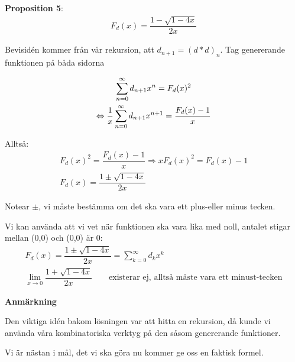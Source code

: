 \par\bigskip
\noindent\textbf{Proposition 5}:
\begin{equation*}
  \begin{gathered}
    F_d(x) = \dfrac{1-\sqrt{1-4x}}{2x}
  \end{gathered}
\end{equation*}
\par\bigskip
\noindent Bevisid\'en kommer från vår rekursion, att $d_{n+1} = (d*d)_n$. Tag genererande funktionen på båda sidorna
\par\bigskip
\begin{prf}[]{}
  \begin{equation*}
    \begin{gathered}
      \sum_{n=0}^{\infty}d_{n+1}x^n =  F_d(x)^2\\
      \Leftrightarrow\dfrac{1}{x}\sum_{n=0}^{\infty}d_{n+1}x^{n+1} =\dfrac{F_d(x)-1}{x}
    \end{gathered}
  \end{equation*}\par
  \noindent Alltså:
  \begin{equation*}
    \begin{gathered}
      F_d(x)^2 = \dfrac{F_d(x)-1}{x}\Rightarrow xF_d(x)^2 = F_d(x)-1\\
      F_d(x) = \dfrac{1\pm\sqrt{1-4x}}{2x}
    \end{gathered}
  \end{equation*}\par
  \noindent Notear $\pm$, vi måste bestämma om det ska vara ett plus-eller minus tecken.\par
  \noindent Vi kan använda att vi vet när funktionen ska vara lika med noll, antalet stigar mellan (0,0) och (0,0) är 0:
  \begin{equation*}
    \begin{gathered}
      F_d(x) = \dfrac{1\pm\sqrt{1-4x}}{2x} = \sum_{k=0}^{\infty}d_kx^k\\
      \lim_{x\to0}\dfrac{1+\sqrt{1-4x}}{2x}\qquad\text{existerar ej, alltså måste vara ett minust-tecken}
    \end{gathered}
  \end{equation*}
\end{prf}
\par\bigskip
\noindent\textbf{Anmärkning}\par
\noindent Den viktiga id\'en bakom lösningen var att hitta en rekursion, då kunde vi använda våra kombinatoriska verktyg på den såsom genererande funktioner.
\par\bigskip
\noindent Vi är nästan i mål, det vi ska göra nu kommer ge oss en faktisk formel.
\par\bigskip 
